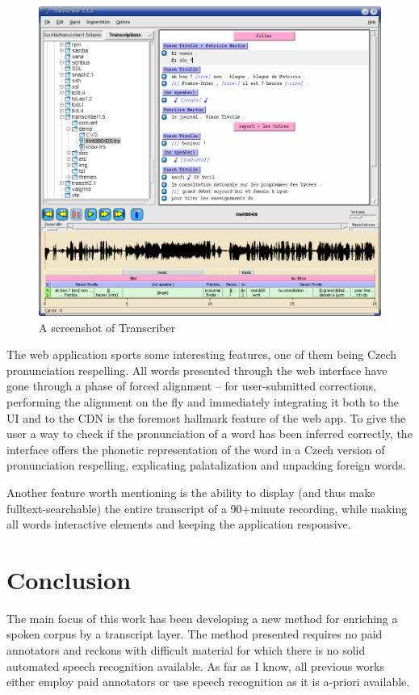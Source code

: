 \documentclass[hidelinks,12pt,a4paper]{report}
\begin{document}
\begin{figure}[htpb]
\includegraphics[scale=0.4]{rc/transcriber1.png}
\caption{A screenshot of Transcriber}
\label{fig:transcriber1}
\end{figure}

The web application sports some interesting features, one of them being Czech
pronunciation respelling. All words presented through the web interface have
gone through a phase of forced alignment -- for user-submitted corrections,
performing the alignment on the fly and immediately integrating it both to the
UI and to the CDN is the foremost hallmark feature of the web app. To give the
user a way to check if the pronunciation of a word has been inferred correctly,
the interface offers the phonetic representation of the word in a Czech version
of pronunciation respelling, explicating palatalization and unpacking foreign
words.

Another feature worth mentioning is the ability to display (and thus make
fulltext-searchable) the entire transcript of a 90+minute recording, while
making all words interactive elements and keeping the application responsive.

\chapter{Conclusion}

The main focus of this work has been developing a new method for enriching a
spoken corpus by a transcript layer. The method presented requires no paid
annotators and reckons with difficult material for which there is no solid
automated speech recognition available. As far as I know, all previous works
either employ paid annotators or use speech recognition as it is a-priori
available.
\end{document}
